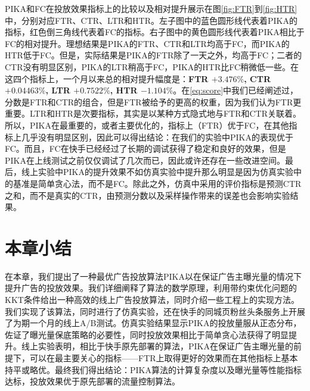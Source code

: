 PIKA和FC在投放效果指标上的比较以及相对提升展示在图\ref{fig:FTR}到\ref{fig:HTR}中，分别对应FTR、CTR、LTR和HTR。左子图中的蓝色圆形线代表着PIKA的指标，红色倒三角线代表着FC的指标。右子图中的黄色圆形线代表着PIKA相比于FC的相对提升。理想结果是PIKA的FTR、CTR和LTR均高于FC，而PIKA的HTR低于FC。但是，实际结果是PIKA的FTR除了一天之外，均高于FC；二者的CTR没有明显区别，PIKA的LTR稍高于FC，PIKA的HTR比FC稍微低一些。在这四个指标上，一个月以来总的相对提升幅度是：\textbf{FTR $+3.476\%$, CTR $+0.04463\%$, LTR $+0.7522\%$, HTR $-1.104\%$}。在\eqref{eq:score}中我们已经阐述过，分数是FTR和CTR的组合，但是FTR被给予的更高的权重，因为我们认为FTR更重要。LTR和HTR是次要指标，其实是以某种方式隐式地与FTR和CTR关联着。所以，PIKA在最重要的，或者主要优化的，指标上（FTR）优于FC，在其他指标上几乎没有明显区别，因此可以得出结论：在我们的实验中PIKA的表现优于FC。而且，FC在快手已经经过了长期的调试获得了稳定和良好的效果，但是PIKA在上线测试之前仅仅调试了几次而已，因此或许还存在一些改进空间。最后，线上实验中PIKA的提升效果不如仿真实验中提升那么明显是因为仿真实验中的基准是简单贪心法，而不是FC。除此之外，仿真中采用的评价指标是预测CTR之和，而不是真实的CTR，由预测分数以及采样操作带来的误差也会影响实验结果。

\section{本章小结}

在本章，我们提出了一种最优广告投放算法PIKA以在保证广告主曝光量的情况下提升广告的投放效果。我们详细阐释了算法的数学原理，利用带约束优化问题的KKT条件给出一种高效的线上广告投放算法，同时介绍一些工程上的实现方法。我们实现了该算法，同时进行了仿真实验，还在快手的同城页粉丝头条服务上开展了为期一个月的线上A/B测试。仿真实验结果显示PIKA的投放量服从正态分布，佐证了曝光量保底策略的必要性，同时投放效果相比于简单贪心法获得了明显提升。线上实验表明，相比于快手原先部署的算法，PIKA在保证广告主曝光量的前提下，可以在最主要关心的指标——FTR上取得更好的效果而在其他指标上基本持平或略优。最终我们得出结论：PIKA算法的计算复杂度以及曝光量等性能指标达标，投放效果优于原先部署的流量控制算法。






